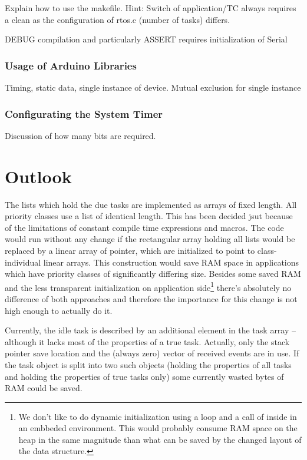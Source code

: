 Explain how to use the makefile. Hint: Switch of application/TC always
requires a clean as the configuration of rtos.c (number of tasks) differs.

DEBUG compilation and particularly ASSERT requires initialization of Serial


\subsection{Usage of Arduino Libraries}

Timing, static data, single instance of device. Mutual exclusion for
single instance


\subsection{Configurating the System Timer}

Discussion of how many bits are required. 


\chapter{Outlook}
\label{secOutlook}

The lists which hold the due tasks are implemented as arrays of fixed
length. All priority classes use a list of identical length. This has been
decided jsut because of the limitations of constant compile time
expressions and macros. The code would run without any change if the
rectangular array holding all lists would be replaced by a linear array of
pointer, which are initialized to point to class-individual linear arrays.
This construction would save RAM space in applications which have priority
classes of significantly differing size. Besides some saved RAM and the
less transparent initialization on application side\footnote{We don't like
to do dynamic initialization using a loop and a call of 
inside in an embbeded environment. This would probably consume RAM space
on the heap in the same magnitude than what can be saved by the changed
layout of the data structure.} there's absolutely no difference of
both approaches and therefore the importance for this change is not high
enough to actually do it.

Currently, the idle task is described by an additional element in the task
array -- although it lacks most of the properties of a true task.
Actually, only the stack pointer save location and the (always zero)
vector of received events are in use. If the task object is split into two
such objects (holding the properties of all tasks and holding the
properties of true tasks only) some currently wasted bytes of RAM could be
saved.

